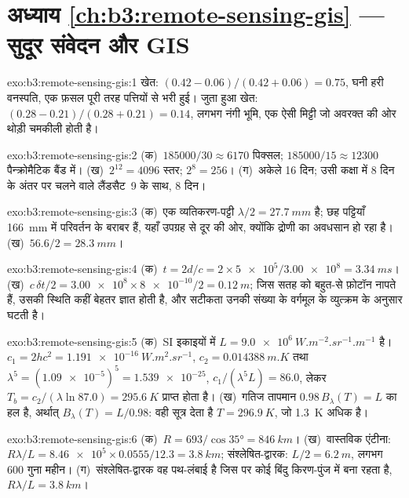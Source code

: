 \section*{अध्याय \ref{ch:b3:remote-sensing-gis} --- सुदूर संवेदन और GIS}

\begin{solution}{exo:b3:remote-sensing-gis:1}
खेत: $(0.42 - 0.06)/(0.42 + 0.06) = 0.75$, घनी हरी वनस्पति, एक फ़सल
पूरी तरह पत्तियों से भरी हुई। जुता हुआ खेत: $(0.28 - 0.21)/(0.28 + 0.21) = 0.14$, लगभग
नंगी भूमि, एक ऐसी मिट्टी जो अवरक्त की ओर थोड़ी चमकीली होती है।
\end{solution}

\begin{solution}{exo:b3:remote-sensing-gis:2}
(क)~$185000/30 \approx 6170$ पिक्सल; $185000/15 \approx 12300$ पैन्क्रोमैटिक
बैंड में। (ख)~$2^{12} = 4096$ स्तर; $2^8 = 256$। (ग)~अकेले 16 दिन;
उसी कक्षा में 8 दिन के अंतर पर चलने वाले लैंडसैट~9 के साथ, 8 दिन।
\end{solution}

\begin{solution}{exo:b3:remote-sensing-gis:3}
(क)~एक व्यतिकरण-पट्टी $\lambda/2 = \qty{27.7}{mm}$ है; छह पट्टियाँ
\qty{166}{mm}  में परिवर्तन के बराबर हैं, यहाँ उपग्रह से दूर की ओर, क्योंकि
द्रोणी का अवधसान हो रहा है। (ख)~$56.6/2 = \qty{28.3}{mm}$।
\end{solution}

\begin{solution}{exo:b3:remote-sensing-gis:4}
(क)~$t = 2d/c = 2\times\num{5e5}/\num{3.00e8} = \qty{3.34}{ms}$।
(ख)~$c\,\delta t/2 = \num{3.00e8}\times\num{8e-10}/2 = \qty{0.12}{m}$; जिस सतह को बहुत-से फ़ोटॉन
नापते हैं, उसकी स्थिति कहीं बेहतर ज्ञात होती है, और सटीकता
उनकी संख्या के वर्गमूल के व्युत्क्रम के अनुसार घटती है।
\end{solution}

\begin{solution}{exo:b3:remote-sensing-gis:5}
(क)~SI इकाइयों में $L = \qty{9.0e6}{W.m^{-2}.sr^{-1}.m^{-1}}$ है। $c_1 =
2hc^2 = \qty{1.191e-16}{W.m^2.sr^{-1}}$, $c_2 = \qty{0.014388}{m.K}$ तथा
$\lambda^5 = (\num{1.09e-5})^5 = \num{1.539e-25}$, $c_1/(\lambda^5L) = 86.0$,
लेकर $T_b = c_2/(\lambda\ln 87.0) = \qty{295.6}{K}$ प्राप्त होता है। (ख)~गतिज तापमान
$0.98\,B_\lambda(T) = L$ का हल है, अर्थात् $B_\lambda(T) = L/0.98$: वही
सूत्र देता है $T = \qty{296.9}{K}$, जो \qty{1.3}{K} अधिक है।
\end{solution}

\begin{solution}{exo:b3:remote-sensing-gis:6}
(क)~$R = 693/\cos\ang{35} = \qty{846}{km}$। (ख)~वास्तविक एंटीना: $R\lambda/L =
\num{8.46e5}\times0.0555/12.3 = \qty{3.8}{km}$; संश्लेषित-द्वारक: $L/2 =
\qty{6.2}{m}$, लगभग 600 गुना महीन। (ग)~संश्लेषित-द्वारक वह
पथ-लंबाई है जिस पर कोई बिंदु किरण-पुंज में बना रहता है, $R\lambda/L =
\qty{3.8}{km}$।
\end{solution}

